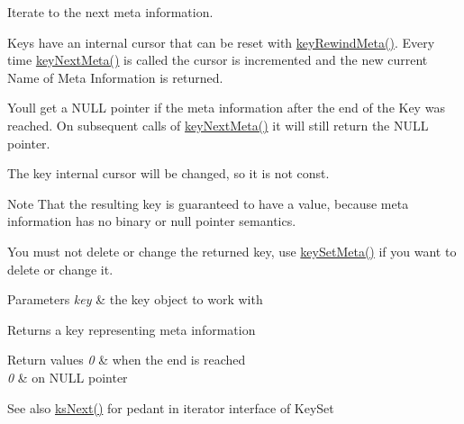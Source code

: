 Iterate to the next meta information. 

Keys have an internal cursor that can be reset with \mbox{\hyperlink{group__keymeta_ga5dbb669802eea27e106ee3a5e39717a9}{key\+Rewind\+Meta()}}. Every time \mbox{\hyperlink{group__keymeta_ga4c88342f580a4291455a801af71ce048}{key\+Next\+Meta()}} is called the cursor is incremented and the new current Name of Meta Information is returned.

You\textquotesingle{}ll get a N\+U\+LL pointer if the meta information after the end of the Key was reached. On subsequent calls of \mbox{\hyperlink{group__keymeta_ga4c88342f580a4291455a801af71ce048}{key\+Next\+Meta()}} it will still return the N\+U\+LL pointer.

The {\ttfamily key} internal cursor will be changed, so it is not const.

\begin{DoxyNote}{Note}
That the resulting key is guaranteed to have a value, because meta information has no binary or null pointer semantics.

You must not delete or change the returned key, use \mbox{\hyperlink{group__keymeta_gae1f15546b234ffb6007d8a31178652b9}{key\+Set\+Meta()}} if you want to delete or change it.
\end{DoxyNote}

\begin{DoxyParams}{Parameters}
{\em key} & the key object to work with \\
\hline
\end{DoxyParams}
\begin{DoxyReturn}{Returns}
a key representing meta information 
\end{DoxyReturn}

\begin{DoxyRetVals}{Return values}
{\em 0} & when the end is reached \\
\hline
{\em 0} & on N\+U\+LL pointer\\
\hline
\end{DoxyRetVals}
\begin{DoxySeeAlso}{See also}
\mbox{\hyperlink{group__keyset_ga317321c9065b5a4b3e33fe1c399bcec9}{ks\+Next()}} for pedant in iterator interface of Key\+Set 
\end{DoxySeeAlso}
\mbox{\label{group__keymeta_ga5dbb669802eea27e106ee3a5e39717a9}} 
